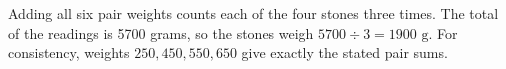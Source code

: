 Adding all six pair weights counts each of the four stones three times. The total of the readings is 5700 grams, so the stones weigh $5700\div3=\boxed{1900\text{ g}}$. For consistency, weights $250,450,550,650$ give exactly the stated pair sums.
